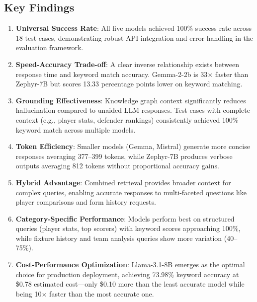 \documentclass[11pt, a4paper]{article}
\begin{document}
\subsection{Key Findings}
\begin{enumerate}
    \item \textbf{Universal Success Rate}: All five models achieved 100\% success rate across 18 test cases, demonstrating robust API integration and error handling in the evaluation framework.
    
    \item \textbf{Speed-Accuracy Trade-off}: A clear inverse relationship exists between response time and keyword match accuracy. Gemma-2-2b is 33$\times$ faster than Zephyr-7B but scores 13.33 percentage points lower on keyword matching.
    
    \item \textbf{Grounding Effectiveness}: Knowledge graph context significantly reduces hallucination compared to unaided LLM responses. Test cases with complete context (e.g., player stats, defender rankings) consistently achieved 100\% keyword match across multiple models.
    
    \item \textbf{Token Efficiency}: Smaller models (Gemma, Mistral) generate more concise responses averaging 377--399 tokens, while Zephyr-7B produces verbose outputs averaging 812 tokens without proportional accuracy gains.
    
    \item \textbf{Hybrid Advantage}: Combined retrieval provides broader context for complex queries, enabling accurate responses to multi-faceted questions like player comparisons and form history requests.
    
    \item \textbf{Category-Specific Performance}: Models perform best on structured queries (player stats, top scorers) with keyword scores approaching 100\%, while fixture history and team analysis queries show more variation (40--75\%).
    
    \item \textbf{Cost-Performance Optimization}: Llama-3.1-8B emerges as the optimal choice for production deployment, achieving 73.98\% keyword accuracy at \$0.78 estimated cost---only \$0.10 more than the least accurate model while being 10$\times$ faster than the most accurate one.
\end{enumerate}

\end{document}
